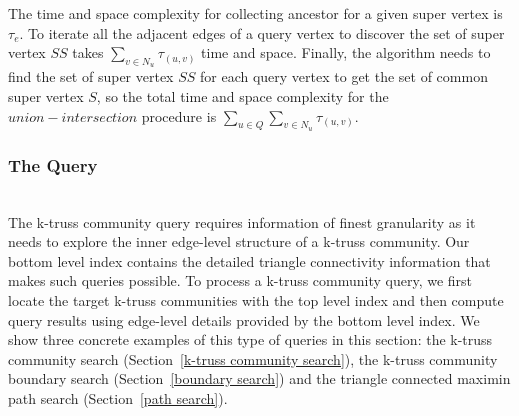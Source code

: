 %

The time and space complexity for collecting ancestor for a given super vertex is$\tau_e$. To iterate all the adjacent edges of a query vertex to discover the set of super vertex $SS$ takes $\sum_{v \in N_u}{\tau_{(u,v)}}$ time and space. Finally, the algorithm needs to find the set of super vertex $SS$ for each query vertex to get the set of common super vertex $S$, so the total time and space complexity for the $union-intersection$ procedure is $\sum_{u \in Q}{\sum_{v \in N_u}{\tau_{(u,v)}}}$. 

\subsubsection{The \BottomLevelProb{} Query}
\label{\bottomlevelprob{}}

~\\The \bottomlevelprob{} k-truss community query requires information of finest granularity as it needs to explore the inner edge-level structure of a k-truss community. Our bottom level index contains the detailed triangle connectivity information that makes such queries possible. To process a k-truss community query, we first locate the target k-truss communities with the top level index and then compute query results using edge-level details provided by the bottom level index.  We show three concrete examples of this type of queries in this section: the k-truss community search (Section~\ref{k-truss community search}), the k-truss community boundary search (Section~\ref{boundary search}) and the triangle connected maximin path search (Section~\ref{path search}).

